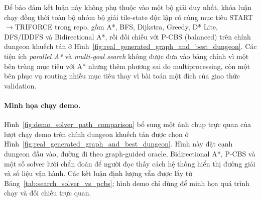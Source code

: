 \documentclass[oneside,a4paper,12pt]{extreport}
\begin{document}
Để bảo đảm kết luận này không phụ thuộc vào một bộ giải duy nhất, khóa luận chạy đồng thời toàn bộ nhóm bộ giải tile-state độc lập có cùng mục tiêu START$\rightarrow$TRIFORCE trong repo, gồm A*, BFS, Dijkstra, Greedy, D* Lite, DFS/IDDFS và Bidirectional A*, rồi đối chiếu với P-CBS (balanced) trên chính dungeon khuếch tán ở Hình~\ref{fig:real_generated_graph_and_best_dungeon}. Các tiện ích \emph{parallel A*} và \emph{multi-goal search} không được đưa vào bảng chính vì một bên trùng mục tiêu với A* nhưng thêm phương sai do multiprocessing, còn một bên phục vụ routing nhiều mục tiêu thay vì bài toán một đích của giao thức validation.

\begin{table}[H]
\centering
\small
\setlength{\tabcolsep}{4pt}
\renewcommand{\arraystretch}{1.08}
\caption{So sánh bộ giải tìm kiếm trên dungeon khuếch tán sinh từ full pipeline thật}
\label{tab:search_solver_vs_pcbs}
\end{table}

\paragraph{Minh họa chạy demo.}
Hình~\ref{fig:demo_solver_path_comparison} bổ sung một ảnh chụp trực quan của lượt chạy demo trên chính dungeon khuếch tán được chọn ở Hình~\ref{fig:real_generated_graph_and_best_dungeon}. Hình này đặt cạnh dungeon đầu vào, đường đi theo graph-guided oracle, Bidirectional A*, P-CBS và một số solver lưới chẩn đoán để người đọc thấy cách hệ thống hiển thị đường giải và số liệu vận hành. Các kết luận định lượng vẫn được lấy từ Bảng~\ref{tab:search_solver_vs_pcbs}; hình demo chỉ dùng để minh họa quá trình chạy và đối chiếu trực quan.
\end{document}
